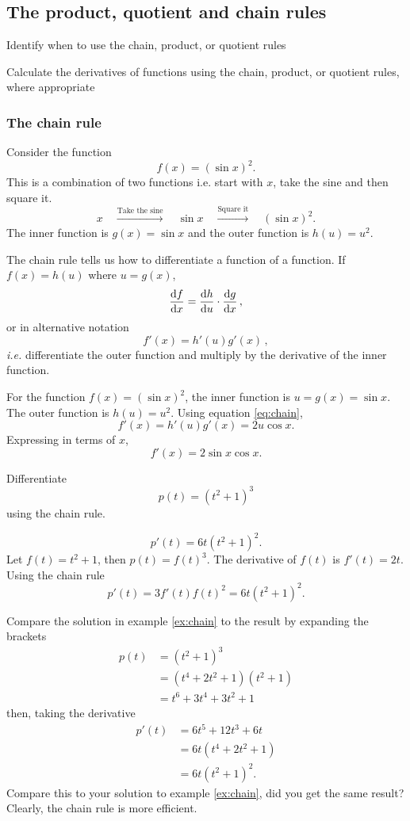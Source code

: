 \goodbreak
\subsection{The product, quotient and chain rules}
\label{sec:prod_quo_chain}

\begin{learningoutcomes}
\item Identify when to use the chain, product, or quotient rules
\item Calculate the derivatives of functions using the chain, product, or quotient rules, where appropriate
\end{learningoutcomes}

\subsubsection{The chain rule}

Consider the function
\[
f(x)=(\sin x)^2.
\]
This is a combination of two functions i.e. start with $x$, take the sine and then square it.
\[
x \quad \xrightarrow{\text{Take the sine}} \quad \sin x
\quad \xrightarrow{\text{Square it}} \quad (\sin x)^2.
\]
The inner function is $g(x)=\sin x$ and the outer function is
$h(u)=u^2$.

The chain rule tells us how to differentiate a function of a function. If $f(x)=h(u)$ where $u=g(x)$,
\begin{equation}
\label{eq:chain}  \frac{{\rm d} f}{{\rm d} x} = \frac{{\rm d} h}{{\rm d} u} \cdot \frac{{\rm d} g}{{\rm d} x}\, ,
\end{equation}
or in alternative notation
\[
    f'(x)=h'(u)g'(x) \, ,
\]
\textit{i.e.} differentiate the outer function and multiply by the derivative of the inner function.

For the function $f(x)=(\sin x)^2$, the inner function is $u=g(x)=\sin x$. The outer function is $h(u)=u^2$. Using equation \eqref{eq:chain},
\[
f'(x)=h'(u)g'(x)=2u\cos x.
\]
Expressing in terms of $x$,
\[
f'(x)=2\sin x\cos x.
\]

\goodbreak
\begin{example}[DIY]
\label{ex:chain}
Differentiate
\[
p(t)=(t^2+1)^3
\]
using the chain rule.
\end{example}
%
\begin{blanksol}
\[
p'(t)=6t(t^2+1)^2.
\]
Let $f(t)=t^2+1$, then $p(t)=f(t)^3$. The derivative of $f(t)$ is $f'(t)=2t$. Using the chain rule
\[
p'(t)=3f'(t)f(t)^2=6t(t^2+1)^2.
\]
\end{blanksol}

Compare the solution in example \ref{ex:chain} to the result by expanding the brackets
\begin{align*}
p(t)&=(t^2+1)^3\\
&=(t^4+2t^2+1)(t^2+1)\\
&=t^6+3t^4+3t^2+1
\end{align*}
then, taking the derivative
\begin{align*}
p'(t)&=6t^5+12t^3+6t\\
&=6t(t^4+2t^2+1)\\
&=6t(t^2+1)^2.
\end{align*}
Compare this to your solution to example \ref{ex:chain}, did you get the same result? Clearly, the chain rule is more efficient. 

